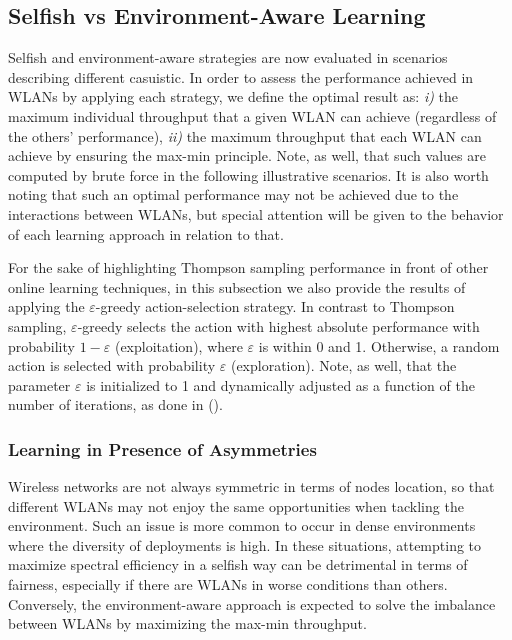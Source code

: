 \documentclass[preprint,12pt]{elsarticle}
\begin{document}
\subsection{Selfish vs Environment-Aware Learning}
\label{subsection:selfish_vs_informed}  
Selfish and environment-aware strategies are now evaluated in scenarios describing different casuistic. In order to assess the performance achieved in WLANs by applying each strategy, we define the optimal result as: \emph{i)} the maximum individual throughput that a given WLAN can achieve (regardless of the others' performance), \emph{ii)} the maximum throughput that each WLAN can achieve by ensuring the max-min principle. Note, as well, that such values are computed by brute force in the following illustrative scenarios. It is also worth noting that such an optimal performance may not be achieved due to the interactions between WLANs, but special attention will be given to the behavior of each learning approach in relation to that.

For the sake of highlighting Thompson sampling performance in front of other online learning techniques, in this subsection we also provide the results of applying the $\varepsilon$-greedy action-selection strategy. In contrast to Thompson sampling, $\varepsilon$-greedy selects the action with highest absolute performance with probability $1-\varepsilon$ (exploitation), where $\varepsilon$ is within 0 and 1. Otherwise, a random action is selected with probability $\varepsilon$ (exploration). Note, as well, that the parameter $\varepsilon$ is initialized to 1 and dynamically adjusted as a function of the number of iterations, as done in (\citealp{auer2002finite}).

\subsubsection{Learning in Presence of Asymmetries}
\label{subsubsection:fairness}  	
Wireless networks are not always symmetric in terms of nodes location, so that different WLANs may not enjoy the same opportunities when tackling the environment. Such an issue is more common to occur in dense environments where the diversity of deployments is high. In these situations, attempting to maximize spectral efficiency in a selfish way can be detrimental in terms of fairness, especially if there are WLANs in worse conditions than others. Conversely, the environment-aware approach is expected to solve the imbalance between WLANs by maximizing the max-min throughput.
\end{document}
